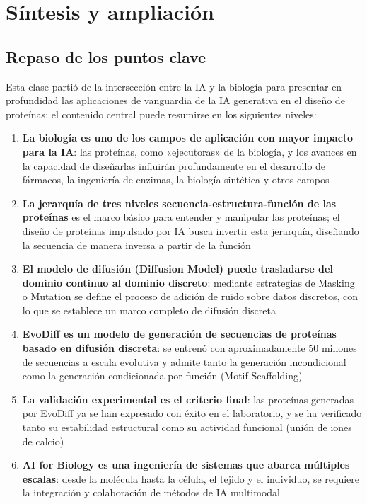\section{Síntesis y ampliación}

\subsection{Repaso de los puntos clave}

Esta clase partió de la intersección entre la IA y la biología para presentar en profundidad las aplicaciones de vanguardia de la IA generativa en el diseño de proteínas; el contenido central puede resumirse en los siguientes niveles:

\begin{enumerate}
    \item \textbf{La biología es uno de los campos de aplicación con mayor impacto para la IA}: las proteínas, como «ejecutoras» de la biología, y los avances en la capacidad de diseñarlas influirán profundamente en el desarrollo de fármacos, la ingeniería de enzimas, la biología sintética y otros campos

    \item \textbf{La jerarquía de tres niveles secuencia-estructura-función de las proteínas} es el marco básico para entender y manipular las proteínas; el diseño de proteínas impulsado por IA busca invertir esta jerarquía, diseñando la secuencia de manera inversa a partir de la función

    \item \textbf{El modelo de difusión (Diffusion Model) puede trasladarse del dominio continuo al dominio discreto}: mediante estrategias de Masking o Mutation se define el proceso de adición de ruido sobre datos discretos, con lo que se establece un marco completo de difusión discreta

    \item \textbf{EvoDiff es un modelo de generación de secuencias de proteínas basado en difusión discreta}: se entrenó con aproximadamente 50 millones de secuencias a escala evolutiva y admite tanto la generación incondicional como la generación condicionada por función (Motif Scaffolding)

    \item \textbf{La validación experimental es el criterio final}: las proteínas generadas por EvoDiff ya se han expresado con éxito en el laboratorio, y se ha verificado tanto su estabilidad estructural como su actividad funcional (unión de iones de calcio)

    \item \textbf{AI for Biology es una ingeniería de sistemas que abarca múltiples escalas}: desde la molécula hasta la célula, el tejido y el individuo, se requiere la integración y colaboración de métodos de IA multimodal
\end{enumerate}

